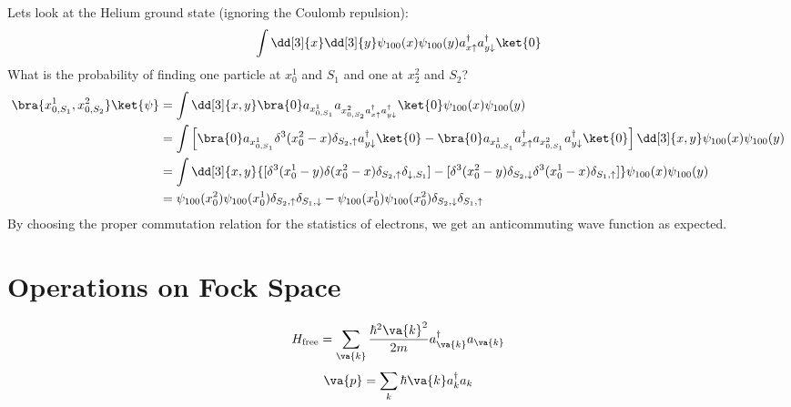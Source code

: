 \documentclass[a4paper,twoside,master.tex]{subfiles}
\begin{document}
Lets look at the Helium ground state (ignoring the Coulomb repulsion):
\begin{equation}
    \int \dd[3]{x} \dd[3]{y} \psi_{100}(x) \psi_{100}(y) a_{x\uparrow}^\dagger a_{y\downarrow}^\dagger\ket{0}
\end{equation}
What is the probability of finding one particle at $ x_0^1 $ and $ S_1 $ and one at $ x_2^2 $ and $ S_2 $?
\begin{align}
    \bra{x_{0,S_1}^1, x_{0,S_2}^2}\ket{\psi} &= \int \dd[3]{x,y}\bra{0} a_{x_{0,S_1}^1} a_{x_{0,S_2}^2 a_{x\uparrow}^\dagger a_{y\downarrow}^\dagger}\ket{0} \psi_{100}(x) \psi_{100}(y) \\
    &= \int \left[\bra{0} a_{x_{0,S_1}^1} \delta^3 (x_0^2 - x) \delta_{S_2,\uparrow} a_{y\downarrow}^\dagger\ket{0} -\bra{0} a_{x_{0,S_1}^1} a^\dagger_{x\uparrow} a_{x_{0,S_1}^2} a_{y\downarrow}^\dagger\ket{0} \right] \dd[3]{x,y} \psi_{100}(x) \psi_{100}(y) \\
    &= \int \dd[3]{x,y} \{[\delta^3(x_0^1 - y) \delta(x_0^2 - x) \delta_{S_2,\uparrow} \delta_{\downarrow, S_1} ] - [\delta^3(x_0^2 - y) \delta_{S_2,\downarrow} \delta^3(x_0^1 - x) \delta_{S_1,\uparrow}]\} \psi_{100}(x) \psi_{100}(y) \\
    &= \psi_{100}(x_0^2) \psi_{100}(x_0^1) \delta_{S_2,\uparrow} \delta_{S_1,\downarrow} - \psi_{100}(x_0^1) \psi_{100}(x_0^2) \delta_{S_2, \downarrow} \delta_{S_1,\uparrow}
\end{align}
By choosing the proper commutation relation for the statistics of electrons, we get an anticommuting wave function as expected.

\section{Operations on Fock Space}
\label{sec:operations_on_fock_space}

\begin{equation}
    H_{\text{free}} = \sum_{\va{k}} \frac{\hbar^2 \va{k}^2}{2m} a_{\va{k}}^\dagger a_{\va{k}}
\end{equation}
\begin{equation}
    \va{p} = \sum_k \hbar \va{k} a_k^\dagger a_k
\end{equation}
\end{document}
